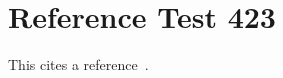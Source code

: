 \documentclass{article}
\begin{document}
\section{Reference Test 423}
This cites a reference~\cite{test423}.

\end{document}
